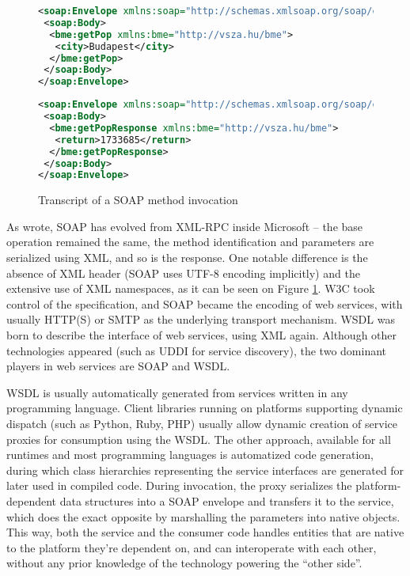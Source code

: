 \begin{figure}[htbp]
 \centering
 \begin{minipage}[t]{0.47\linewidth}
  \centering
  \begin{lstlisting}[language=XML, numbers=off]
<soap:Envelope xmlns:soap="http://schemas.xmlsoap.org/soap/envelope/">
 <soap:Body>
  <bme:getPop xmlns:bme="http://vsza.hu/bme">
   <city>Budapest</city>
  </bme:getPop>
 </soap:Body>
</soap:Envelope>
  \end{lstlisting}
 \end{minipage}
 \hspace{0.5cm}
 \begin{minipage}[t]{0.47\linewidth}
  \centering
  \begin{lstlisting}[language=XML, numbers=off]
<soap:Envelope xmlns:soap="http://schemas.xmlsoap.org/soap/envelope/">
 <soap:Body>
  <bme:getPopResponse xmlns:bme="http://vsza.hu/bme">
   <return>1733685</return>
  </bme:getPopResponse>
 </soap:Body>
</soap:Envelope>
  \end{lstlisting}
 \end{minipage}
 \caption{Transcript of a SOAP method invocation}
 \label{fig:soap-sample}
\end{figure}

As \cite{box_soap_history} wrote, SOAP has evolved from XML-RPC inside Microsoft -- the base operation remained the same, the method identification and parameters are serialized using XML, and so is the response. One notable difference is the absence of XML header (SOAP uses UTF-8 encoding implicitly) and the extensive use of XML namespaces, as it can be seen on Figure \ref{fig:soap-sample}. W3C took control of the specification, and SOAP became the encoding of web services, with usually HTTP(S) or SMTP as the underlying transport mechanism. WSDL was born to describe the interface of web services, using XML again. Although other technologies appeared (such as UDDI for service discovery), the two dominant players in web services are SOAP and WSDL.

WSDL is usually automatically generated from services written in any programming language. Client libraries running on platforms supporting dynamic dispatch (such as Python, Ruby, PHP) usually allow dynamic creation of service proxies for consumption using the WSDL. The other approach, available for all runtimes and most programming languages is automatized code generation, during which class hierarchies representing the service interfaces are generated for later used in compiled code. During invocation, the proxy serializes the platform-dependent data structures into a SOAP envelope and transfers it to the service, which does the exact opposite by marshalling the parameters into native objects. This way, both the service and the consumer code handles entities that are native to the platform they're dependent on, and can interoperate with each other, without any prior knowledge of the technology powering the ``other side''.

